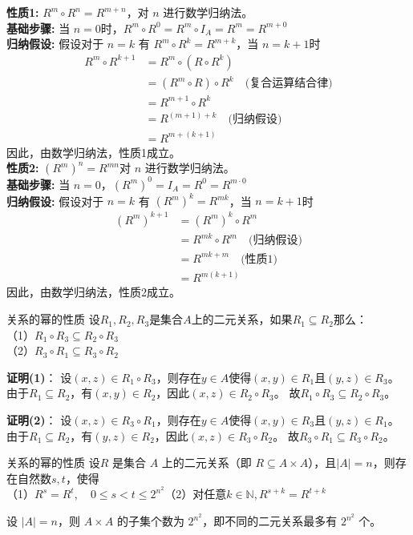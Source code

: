 \documentclass[lang=cn,11pt]{elegantbook}
\begin{document}
\textbf{性质1:} \( R^m \circ R^n = R^{m+n} \)，对 \( n \) 进行数学归纳法。\\
\textbf{基础步骤:} 当 \( n = 0 \)时，$R^m \circ R^0 = R^m \circ I_A = R^m = R^{m+0}$\\
\textbf{归纳假设:} 假设对于 \( n = k \) 有 \( R^m \circ R^k = R^{m+k} \)，当 \( n = k+1 \)时
\begin{align*}
R^m \circ R^{k+1} &= R^m \circ (R \circ R^k) \\
&= (R^m \circ R) \circ R^k \quad \text{(复合运算结合律)} \\
&= R^{m+1} \circ R^k \\
&= R^{(m+1)+k} \quad \text{(归纳假设)} \\
&= R^{m+(k+1)}
\end{align*}
因此，由数学归纳法，性质1成立。\\
\textbf{性质2:} \( (R^m)^n = R^{mn} \)对 \( n \) 进行数学归纳法。\\
\textbf{基础步骤:} 当 \( n = 0 \)，$(R^m)^0 = I_A = R^0 = R^{m \cdot 0}$\\
\textbf{归纳假设:} 假设对于 \( n = k \) 有 \( (R^m)^k = R^{mk} \)，当 \( n = k+1 \)时
\begin{align*}
(R^m)^{k+1} &= (R^m)^k \circ R^m \\
&= R^{mk} \circ R^m \quad \text{(归纳假设)} \\
&= R^{mk + m} \quad \text{(性质1)} \\
&= R^{m(k+1)}
\end{align*}
因此，由数学归纳法，性质2成立。
\begin{theorem}{关系的幂的性质}
设$R_1,R_2,R_3$是集合$A$上的二元关系，如果$R_1\subseteq R_2$那么：\\
（1）$R_1\circ R_3\subseteq R_2\circ R_3$\\
（2）$R_3\circ R_1\subseteq R_3\circ R_2$
\end{theorem}
\textbf{证明(1)}：
设$(x,z)\in R_1\circ R_3$，则存在$y\in A$使得$(x,y)\in R_1$且$(y,z)\in R_3$。
由于$R_1\subseteq R_2$，有$(x,y)\in R_2$，因此$(x,z)\in R_2\circ R_3$。
故$R_1\circ R_3\subseteq R_2\circ R_3$。

\textbf{证明(2)}：
设$(x,z)\in R_3\circ R_1$，则存在$y\in A$使得$(x,y)\in R_3$且$(y,z)\in R_1$。
由于$R_1\subseteq R_2$，有$(y,z)\in R_2$，因此$(x,z)\in R_3\circ R_2$。
故$R_3\circ R_1\subseteq R_3\circ R_2$。
\begin{theorem}{关系的幂的性质}
    设\( R \) 是集合 \( A \) 上的二元关系（即 \( R \subseteq A \times A \)），且$|A|=n$，则存在自然数$s,t$，使得\\
    （1）$R^s=R^t,\quad 0\leq s<t\leq 2^{n^2}$\quad（2）对任意$k\in\mathbb{N},R^{s+k}=R^{t+k}$
\end{theorem}
设 $|A| = n$，则 $A \times A$ 的子集个数为 $2^{n^2}$，即不同的二元关系最多有 $2^{n^2}$ 个。
\end{document}
